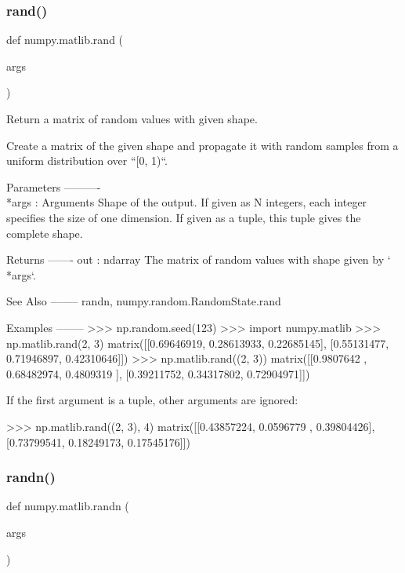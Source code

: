 \subsubsection{\texorpdfstring{rand()}{rand()}}
{\footnotesize\ttfamily def numpy.\+matlib.\+rand (\begin{DoxyParamCaption}\item[{}]{args }\end{DoxyParamCaption})}

\begin{DoxyVerb}Return a matrix of random values with given shape.

Create a matrix of the given shape and propagate it with
random samples from a uniform distribution over ``[0, 1)``.

Parameters
----------
\\*args : Arguments
    Shape of the output.
    If given as N integers, each integer specifies the size of one
    dimension.
    If given as a tuple, this tuple gives the complete shape.

Returns
-------
out : ndarray
    The matrix of random values with shape given by `\\*args`.

See Also
--------
randn, numpy.random.RandomState.rand

Examples
--------
>>> np.random.seed(123)
>>> import numpy.matlib
>>> np.matlib.rand(2, 3)
matrix([[0.69646919, 0.28613933, 0.22685145],
        [0.55131477, 0.71946897, 0.42310646]])
>>> np.matlib.rand((2, 3))
matrix([[0.9807642 , 0.68482974, 0.4809319 ],
        [0.39211752, 0.34317802, 0.72904971]])

If the first argument is a tuple, other arguments are ignored:

>>> np.matlib.rand((2, 3), 4)
matrix([[0.43857224, 0.0596779 , 0.39804426],
        [0.73799541, 0.18249173, 0.17545176]])\end{DoxyVerb}
 \mbox{\label{namespacenumpy_1_1matlib_afa4283aad15eb2e9fc3fdad49dc6d754}} 
\subsubsection{\texorpdfstring{randn()}{randn()}}
{\footnotesize\ttfamily def numpy.\+matlib.\+randn (\begin{DoxyParamCaption}\item[{}]{args }\end{DoxyParamCaption})}

